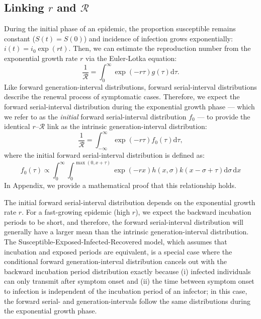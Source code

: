 \documentclass[12pt]{article}
\begin{document}
\subsection{Linking $r$ and $\mathcal R$}

During the initial phase of an epidemic, the proportion susceptible remains constant ($S(t) = S(0)$) and incidence of infection grows exponentially: $i(t)=i_0\exp(rt)$.
Then, we can estimate the reproduction number from the exponential growth rate $r$ via the Euler-Lotka equation:
\begin{equation}
\frac{1}{\mathcal R} = \int_0^\infty \exp(-r\tau) g(\tau) \mathrm{d} \tau.
\end{equation}
Like forward generation-interval distributions, 
forward serial-interval distributions describe the renewal process of symptomatic cases.
Therefore, we expect the forward serial-interval distribution during the exponential growth phase --- which we refer to as the \emph{initial} forward serial-interval distribution $f_0$ --- to provide the identical $r$--$\mathcal R$ link as the intrinsic generation-interval distribution:
\begin{equation}
\frac{1}{\mathcal R} = \int_{-\infty}^\infty \exp(-r\tau) f_{0}(\tau) \mathrm{d} \tau,
\end{equation}
where the initial forward serial-interval distribution is defined as:
\begin{equation}
f_{0}(\tau) \propto \int_{0}^{\infty} \int_{0}^{\max(0,x+\tau)} \exp(-rx) h(x, \sigma) k(x-\sigma+\tau) \mathrm{d}\sigma\,\mathrm{d}x
\end{equation}
In Appendix, we provide a mathematical proof that this relationship holds.

The initial forward serial-interval distribution depends on the exponential growth rate $r$.
For a fast-growing epidemic (high $r$), we expect the backward incubation periods to be short, and therefore, the forward serial-interval distribution will generally have a larger mean than the intrinsic generation-interval distribution.
The Susceptible-Exposed-Infected-Recovered model, which assumes that incubation and exposed periods are equivalent, is a special case where the conditional forward generation-interval distribution cancels out with the backward incubation period distribution exactly because (i) infected individuals can only transmit after symptom onset and (ii) the time between symptom onset to infection is independent of the incubation period of an infector;
in this case, the forward serial- and generation-intervals follow the same distributions during the exponential growth phase.
\end{document}
